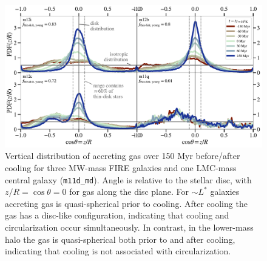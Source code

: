 \documentclass[fleqn,usenatbib]{mnras}
\newcommand{\Rcon}{R_{T=10^5\,{\rm K}}}
\begin{document}

\begin{figure}
    \centering
    \includegraphics[width=\textwidth]{figures/theta_vs_t.pdf}
    \caption{
    Vertical distribution of accreting gas over 150 Myr before/after cooling for three MW-mass FIRE galaxies and one LMC-mass central galaxy (\texttt{m11d\_md}).
    Angle is relative to the stellar disc, with $z/R = \cos\theta=0$ for gas along the disc plane.
    For $\sim L^*$ galaxies accreting gas is quasi-spherical prior to cooling.
    After cooling the gas has a disc-like configuration, indicating that cooling and circularization occur simultaneously. 
    In contrast, in the lower-mass halo the gas is quasi-spherical both prior to and after cooling, indicating that cooling is not associated with circularization.
    }
    \label{f: theta vs t}
\end{figure}
\end{document}
